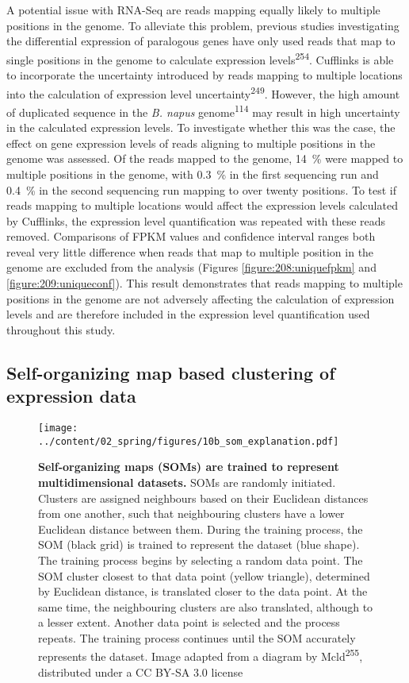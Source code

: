 \documentclass[12pt,]{book}
\begin{document}
A potential issue with RNA-Seq are reads mapping equally likely to
multiple positions in the genome. To alleviate this problem, previous
studies investigating the differential expression of paralogous genes
have only used reads that map to single positions in the genome to
calculate expression levels\textsuperscript{254}. Cufflinks is able to
incorporate the uncertainty introduced by reads mapping to multiple
locations into the calculation of expression level
uncertainty\textsuperscript{249}. However, the high amount of duplicated
sequence in the \emph{B. napus} genome\textsuperscript{114} may result
in high uncertainty in the calculated expression levels. To investigate
whether this was the case, the effect on gene expression levels of reads
aligning to multiple positions in the genome was assessed. Of the reads
mapped to the genome, 14~\% were mapped to multiple positions in the
genome, with 0.3~\% in the first sequencing run and 0.4~\% in the second
sequencing run mapping to over twenty positions. To test if reads
mapping to multiple locations would affect the expression levels
calculated by Cufflinks, the expression level quantification was
repeated with these reads removed. Comparisons of FPKM values and
confidence interval ranges both reveal very little difference when reads
that map to multiple position in the genome are excluded from the
analysis (Figures \ref{figure:208:uniquefpkm} and
\ref{figure:209:uniqueconf}). This result demonstrates that reads
mapping to multiple positions in the genome are not adversely affecting
the calculation of expression levels and are therefore included in the
expression level quantification used throughout this study.

\subsection{Self-organizing map based clustering of expression
data}\label{section:spring:somexplanation}

\begin{figure}[htbp]
\centering
\texttt{[image: ../content/02\_spring/figures/10b\_som\_explanation.pdf]}
\caption{\textbf{Self-organizing maps (SOMs) are trained to represent
multidimensional datasets.} SOMs are randomly initiated. Clusters are
assigned neighbours based on their Euclidean distances from one another,
such that neighbouring clusters have a lower Euclidean distance between
them. During the training process, the SOM (black grid) is trained to
represent the dataset (blue shape). The training process begins by
selecting a random data point. The SOM cluster closest to that data
point (yellow triangle), determined by Euclidean distance, is translated
closer to the data point. At the same time, the neighbouring clusters
are also translated, although to a lesser extent. Another data point is
selected and the process repeats. The training process continues until
the SOM accurately represents the dataset. Image adapted from a diagram
by Mcld\textsuperscript{255}, distributed under a CC BY-SA 3.0
license}\label{figure:215:somexplanation}
\end{figure}
\end{document}
